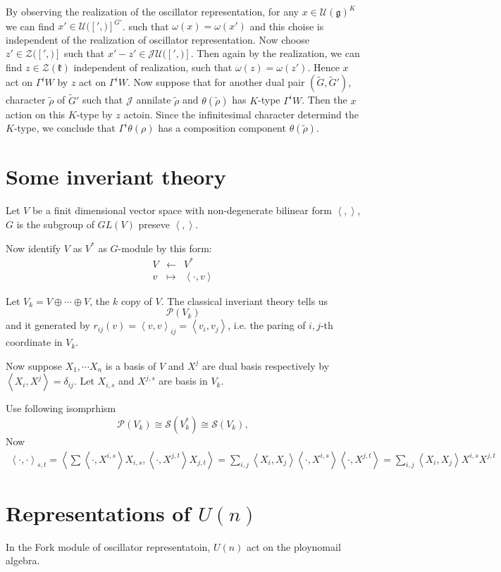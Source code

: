 \documentclass[12pt]{article}
\def\inn#1#2{\left\langle{#1},{#2}\right\rangle}
\def\tG{{\widetilde{G}}}
\def\trho{{\widetilde{\rho}}}
\def\fgg{\mathfrak{g}}
\def\fkk{\mathfrak{k}}
\def\cjj{\mathcal{J}}
\def\css{\mathcal{S}}
\def\cpp{\mathcal{P}}
\def\cuu{\mathcal{U}}
\def\czz{\mathcal{Z}}
\def\cug{\cuu(\fgg)}
\def\cmm#1#2{\left[{#1},{#2}\right]}
\begin{document}
By observing the realization of the oscillator representation, 
for any $x \in \cug^K$ we can find $x'\in \cuu(\cmm')^{G'}$. such that
$\omega(x) = \omega(x')$ and this choise is independent of the realization 
of oscillator representation. Now choose $z' \in \czz(\cmm')$ such that
$x'-z' \in \cjj\cuu(\cmm')$. Then again by the realization, we can find 
$z\in \czz(\fkk)$ independent of realization, 
such that $\omega(z) = \omega(z')$.
Hence $x$ act on $\Gamma^iW$ by $z$ 
act on $\Gamma^iW$.
Now suppose that for another dual pair $(\tG, \tG')$, character $\trho$
of $\tG'$ such that $\cjj$ annilate $\trho$ and $\theta(\trho)$ has 
$K$-type $\Gamma^i W$. Then the $x$ action on this $K$-type by $z$ actoin. 
Since the infinitesimal character determind the $K$-type, we conclude that 
$\Gamma^i\theta(\rho)$ has a composition component $\theta(\trho)$.

   

\appendix
\section{Some inveriant theory}
Let $V$ be a finit dimensional  vector space 
with non-degenerate bilinear form $\inn{}{}$, 
$G$ is the subgroup of $GL(V)$ preseve $\inn{}{}$. 

Now identify $V$ as $V^*$ as $G$-module by this form:
\[
\begin{matrix}
V &\leftarrow& V^*\\
v & \mapsto & \inn{\cdot}{v}
\end{matrix}
\] 

Let $V_k = V\oplus \cdots \oplus V$, the $k$ copy of $V$. 
The classical inveriant theory tells us 
\[
\cpp(V_k) 
\]
and it generated by $r_{ij}(v) = \inn{v}{v}_{ij}= \inn{v_i}{v_j}$,
i.e. the paring of $i,j$-th 
coordinate in $V_k$.

Now suppose $X_1, \cdots X_n$ is a basis of $V$ and 
$X^j$ are dual basis respectively by $\inn{X_i}{X^j} = \delta_{ij}$.
Let $X_{i,s}$ and $X^{j,s}$ are basis in $V_k$. 

Use following isomprhism
\[
\cpp(V_k) \cong \css(V_k^*) \cong \css(V_k),
\]
Now
\[
\begin{split}
\inn{\cdot}{\cdot}_{s,t} = \inn{\sum \inn{\cdot}{X^{i,s}}X_{i,s}}{\inn{\cdot}{X^{j,t}}X_{j,t}} = \sum_{i,j} \inn{X_{i}}{X_{j}}\inn{\cdot}{X^{i,s}}\inn{\cdot}{X^{j,t}}
=\sum_{i,j} \inn{X_i}{X_j} X^{i,s}X^{j,t}
\end{split}
\]

\section{Representations of $U(n)$}
In the Fork module of oscillator representatoin,  
$U(n)$ act on the ploynomail algebra. 
\end{document}
